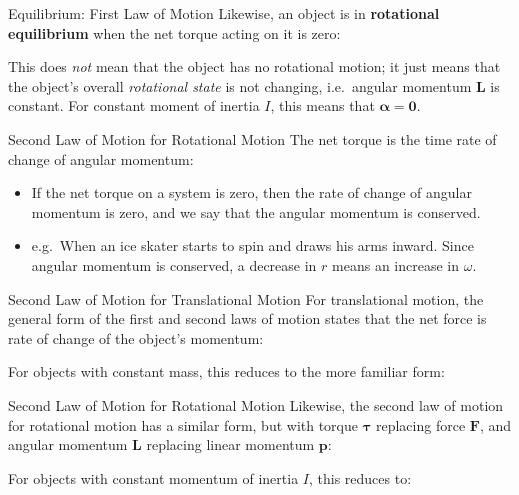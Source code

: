 \documentclass[12pt,compress,aspectratio=169]{beamer}
\begin{document}
\begin{frame}{Equilibrium: First Law of Motion}
  Likewise, an object is in \textbf{rotational equilibrium} when the net torque
  acting on it is zero:

  
  This does \emph{not} mean that the object has no rotational motion; it just
  means that the object's overall \emph{rotational state} is not changing,
  i.e.\  angular momentum $\bm{L}$ is constant. For constant moment of inertia
  $I$, this means that $\bm\alpha=\bm{0}$.
\end{frame}



\begin{frame}{Second Law of Motion for Rotational Motion}
  The net torque is the time rate of change of angular momentum:

  \begin{itemize}
  \item If the net torque on a system is zero, then the rate of change
    of angular momentum is zero, and we say that the angular momentum is
    conserved. 
  \item e.g.\ When an ice skater starts to spin and draws his arms inward.
    Since angular momentum is conserved, a decrease in $r$ means an
    increase in $\omega$.
  \end{itemize}
\end{frame}



\begin{frame}{Second Law of Motion for Translational Motion}
  For translational motion, the general form of the first and second laws of
  motion states that the net force is rate of change of the object's momentum:


  For objects with constant mass, this reduces to the more familiar form:

\end{frame}



\begin{frame}{Second Law of Motion for Rotational Motion}
  Likewise, the second law of motion for rotational motion has a similar
  form, but with torque $\bm\tau$ replacing force $\bm{F}$, and angular
  momentum $\bm{L}$ replacing linear momentum $\bm{p}$:


  For objects with constant momentum of inertia $I$, this reduces to:

\end{frame}
\end{document}
